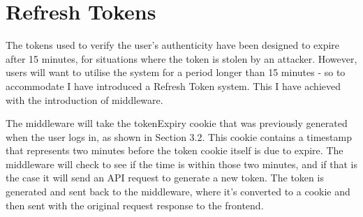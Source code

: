 \documentclass[]{final_report}
\begin{document}
\section{Refresh Tokens}

The tokens used to verify the user's authenticity have been designed to expire after 15 minutes, for situations where the token is stolen by an attacker. However, users will want to utilise the system for a period longer than 15 minutes - so to accommodate I have introduced a Refresh Token system. This I have achieved with the introduction of middleware. 

The middleware will take the tokenExpiry cookie that was previously generated when the user logs in, as shown in Section 3.2. This cookie contains a timestamp that represents two minutes before the token cookie itself is due to expire. The middleware will check to see if the time is within those two minutes, and if that is the case it will send an API request to generate a new token. The token is generated and sent back to the middleware, where it's converted to a cookie and then sent with the original request response to the frontend.
\end{document}

